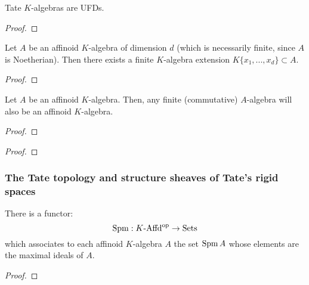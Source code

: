             \begin{corollary} \label{coro: tate_algebras_over_non_archimedean_fields_are_UFDs}
                Tate $K$-algebras are UFDs.
            \end{corollary}
                \begin{proof}
                    
                \end{proof}
            \begin{proposition} \label{prop: affinoid_algebras_admit_noetherian_normalisation}
                Let $A$ be an affinoid $K$-algebra of dimension $d$ (which is necessarily finite, since $A$ is Noetherian). Then there exists a finite $K$-algebra extension $K\{x_1, ..., x_d\} \subset A$.
            \end{proposition}
                \begin{proof}
                    
                \end{proof}
            \begin{corollary}
                Let $A$ be an affinoid $K$-algebra. Then, any finite (commutative) $A$-algebra will also be an affinoid $K$-algebra. 
            \end{corollary}
                \begin{proof}
                    
                \end{proof}
                
            \begin{theorem} \label{theorem: maximum_modulus_principle_for_affinoid_algebras}
                
            \end{theorem}
                \begin{proof}
                    
                \end{proof}
        
        \subsubsection{The Tate topology and structure sheaves of Tate's rigid spaces}
            \begin{proposition} \label{prop: maximal_spectra_of_affinoid_algebras}
                There is a functor:
                    $$\operatorname{Spm}: K\text{-}\mathrm{Affd}^{\mathrm{op}} \to \mathrm{Sets}$$
                which associates to each affinoid $K$-algebra $A$ the set $\operatorname{Spm} A$ whose elements are the maximal ideals of $A$. 
            \end{proposition}
                \begin{proof}
                    
                \end{proof}
            
